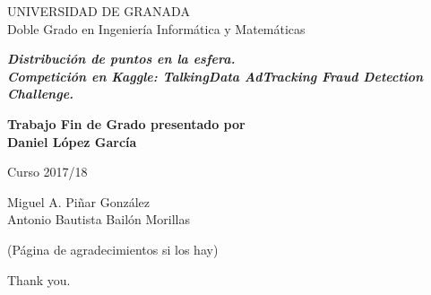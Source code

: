 
\quad

\thispagestyle{empty}


\newpage 



\thispagestyle{empty}


\begin{center}

{\Large UNIVERSIDAD DE GRANADA}\\[10mm]
{\Large\sffamily Doble Grado en Ingeniería Informática y Matemáticas}\\[3mm]


\vspace{3cm}


\begin{Large}
{\slshape\bfseries  Distribución de puntos en la esfera.\\Competición en Kaggle: TalkingData AdTracking Fraud Detection Challenge.\\[6mm]
}
\end{Large}

\vspace{3cm}

\vfill

\begin{large}
{\bf Trabajo Fin de Grado presentado por \\[3mm]
Daniel López García}
\end{large}


\vspace{2cm}

\begin{Large}
Curso 2017/18
\end{Large}
\end{center}

\vfill


\begin{large}
	{Miguel A. Piñar González\\Antonio Bautista Bailón Morillas\\[3mm]}
\end{large}

%

\newpage


\thispagestyle{empty}

\quad

\newpage

\thispagestyle{empty}

\vspace*{2cm}

\begin{flushright}
\parbox{3.5in}
{\small
(P\'agina de agradecimientos si los hay)


Thank you.}

\end{flushright}

\newpage

